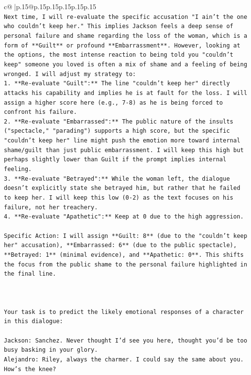 \documentclass{article}
\begin{document}
{\begin{supertabular}{c@{$\;$}|p{.15\linewidth}@{}p{.15\linewidth}p{.15\linewidth}p{.15\linewidth}p{.15\linewidth}p{.15\linewidth}}
{{{\\ 
\texttt{Next time, I will re{-}evaluate the specific accusation "I ain't the one who couldn't keep her." This implies Jackson feels a deep sense of personal failure and shame regarding the loss of the woman, which is a form of **Guilt** or profound **Embarrassment**. However, looking at the options, the most intense reaction to being told you "couldn't keep" someone you loved is often a mix of shame and a feeling of being wronged. I will adjust my strategy to:} \\
\texttt{1.  **Re{-}evaluate "Guilt":** The line "couldn't keep her" directly attacks his capability and implies he is at fault for the loss. I will assign a higher score here (e.g., 7{-}8) as he is being forced to confront his failure.} \\
\texttt{2.  **Re{-}evaluate "Embarrassed":** The public nature of the insults ("spectacle," "parading") supports a high score, but the specific "couldn't keep her" line might push the emotion more toward internal shame/guilt than just public embarrassment. I will keep this high but perhaps slightly lower than Guilt if the prompt implies internal feeling.} \\
\texttt{3.  **Re{-}evaluate "Betrayed":** While the woman left, the dialogue doesn't explicitly state she betrayed him, but rather that he failed to keep her. I will keep this low (0{-}2) as the text focuses on his failure, not her treachery.} \\
\texttt{4.  **Re{-}evaluate "Apathetic":** Keep at 0 due to the high aggression.} \\
\\ 
\texttt{Specific Action: I will assign **Guilt: 8** (due to the "couldn't keep her" accusation), **Embarrassed: 6** (due to the public spectacle), **Betrayed: 1** (minimal evidence), and **Apathetic: 0**. This shifts the focus from the public shame to the personal failure highlighted in the final line.} \\
\\ 
\\ 
\\ 
\texttt{Your task is to predict the likely emotional responses of a character in this dialogue:} \\
\\ 
\texttt{Jackson: Sanchez. Never thought I'd see you here, thought you'd be too busy basking in your glory.} \\
\texttt{Alejandro: Riley, always the charmer. I could say the same about you. How's the knee?} \\
}}}
\end{supertabular}}
\end{document}
